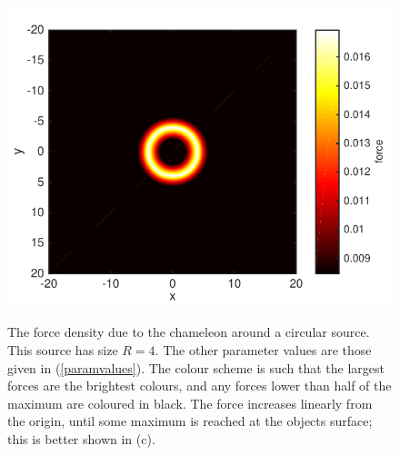 \documentclass[a4paper, 12pt]{article}
\numberwithin{equation}{section}
\begin{document}
\begin{figure}[!t]
      \begin{center}
{\includegraphics[scale=0.8,angle=0]{images/sp_lorho_force_final.pdf}}
      \end{center}
\caption{ The force density due to the chameleon around a circular source. This source has size $R=4$. The other parameter values are those given in (\ref{paramvalues}).   The colour scheme is such that the largest forces are the brightest colours, and any forces lower than half of the maximum are coloured in black.  The force increases linearly from the origin, until some maximum is reached at the objects surface; this is better shown in (c).}\label{fig:circ}
\end{figure}
\end{document}
